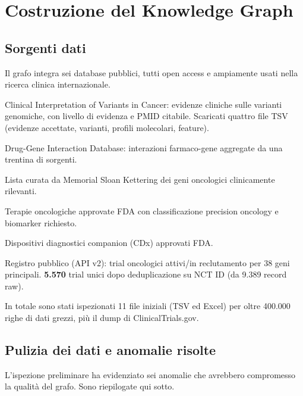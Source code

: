 \documentclass[11pt,a4paper]{article}
\begin{document}
\section{Costruzione del Knowledge Graph}

\subsection{Sorgenti dati}
Il grafo integra sei database pubblici, tutti open access e ampiamente usati nella ricerca clinica internazionale.

\begin{description}[leftmargin=1.4em,font=\bfseries\color{secondary}]
\item[CIViC] Clinical Interpretation of Variants in Cancer: evidenze cliniche sulle varianti genomiche, con livello di evidenza e PMID citabile. Scaricati quattro file TSV (evidenze accettate, varianti, profili molecolari, feature).
\item[DGIdb] Drug-Gene Interaction Database: interazioni farmaco-gene aggregate da una trentina di sorgenti.
\item[OncoKB Cancer Gene List] Lista curata da Memorial Sloan Kettering dei geni oncologici clinicamente rilevanti.
\item[FDA Oncology Therapies] Terapie oncologiche approvate FDA con classificazione precision oncology e biomarker richiesto.
\item[FDA Companion Diagnostic Devices] Dispositivi diagnostici companion (CDx) approvati FDA.
\item[ClinicalTrials.gov] Registro pubblico (API v2): trial oncologici attivi/in reclutamento per 38 geni principali. \textbf{5.570} trial unici dopo deduplicazione su NCT ID (da 9.389 record raw).
\end{description}

In totale sono stati ispezionati 11 file iniziali (TSV ed Excel) per oltre 400.000 righe di dati grezzi, pi\`u il dump di ClinicalTrials.gov.

\subsection{Pulizia dei dati e anomalie risolte}
L'ispezione preliminare ha evidenziato sei anomalie che avrebbero compromesso la qualit\`a del grafo. Sono riepilogate qui sotto.
\end{document}
